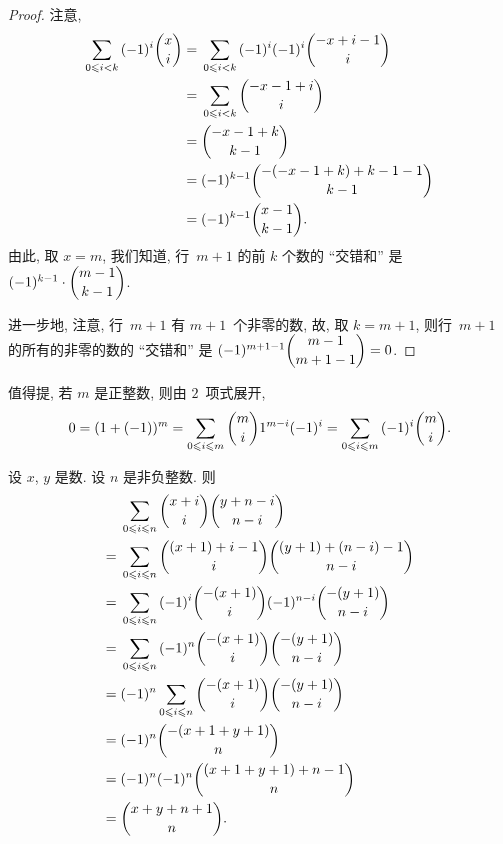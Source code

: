 \documentclass[../libro.tex]{subfiles}
\begin{document}
\begin{proof}
    注意,
    \begin{align*}
        \sum_{0 \leq i < k} {(-1)^i \dbinom{x}{i}}
        = {} &
        \sum_{0 \leq i < k} {(-1)^i (-1)^i
        \dbinom{-x + i - 1}{i}}
        \\
        = {} &
        \sum_{0 \leq i < k} {\dbinom{-x - 1 + i}{i}}
        \\
        = {} &
        \dbinom{-x - 1 + k}{k-1}
        \\
        = {} &
        (-1)^{k-1} \dbinom{-(-x - 1 + k) + k - 1 - 1}{k-1}
        \\
        = {} &
        (-1)^{k-1} \dbinom{x-1}{k-1}.
    \end{align*}
    由此, 取 \(x = m\), 我们知道,
    行~\(m+1\) 的前 \(k\) 个数的 ``交错和'' 是
    \((-1)^{k-1} \allowbreak
    \cdot \dbinom{m-1}{k-1}\).

    进一步地, 注意, 行~\(m+1\) 有 \(m+1\)~个非零的数,
    故, 取 \(k = m + 1\),
    则行~\(m+1\) 的所有的非零的数的 ``交错和'' 是
    \((-1)^{m+1-1} \dbinom{m-1}{m+1-1} = 0\).
\end{proof}

值得提, 若 \(m\) 是正整数, 则由 \(2\)~项式展开,
\begin{align*}
    0 = (1 + (-1))^m
    = \sum_{0 \leq i \leq m} {\dbinom{m}{i} 1^{m-i} (-1)^i}
    = \sum_{0 \leq i \leq m} {(-1)^i \dbinom{m}{i}}.
\end{align*}

\begin{example}
    设 \(x\), \(y\) 是数.
    设 \(n\) 是非负整数.
    则
    \begin{align*}
        &
        \sum_{0 \leq i \leq n} {\dbinom{x+i}{i} \dbinom{y+n-i}{n-i}}
        \\
        = {} &
        \sum_{0 \leq i \leq n} {\dbinom{(x+1)+i-1}{i}
        \dbinom{(y+1)+(n-i)-1}{n-i}}
        \\
        = {} &
        \sum_{0 \leq i \leq n} {(-1)^i \dbinom{-(x+1)}{i}
        (-1)^{n-i} \dbinom{-(y+1)}{n-i}}
        \\
        = {} &
        \sum_{0 \leq i \leq n} {(-1)^n \dbinom{-(x+1)}{i} \dbinom{-(y+1)}{n-i}}
        \\
        = {} &
        (-1)^n \sum_{0 \leq i \leq n} {\dbinom{-(x+1)}{i} \dbinom{-(y+1)}{n-i}}
        \\
        = {} &
        (-1)^n \dbinom{-(x+1+y+1)}{n}
        \\
        = {} &
        (-1)^n (-1)^n \dbinom{(x+1+y+1)+n-1}{n}
        \\
        = {} &
        \dbinom{x+y+n+1}{n}.
        \qefhere
    \end{align*}
\end{example}
\end{document}
